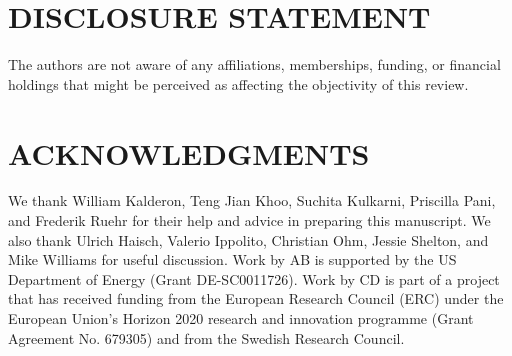 \documentclass{ar-1col}
\begin{document}
\section*{DISCLOSURE STATEMENT}
The authors are not aware of any affiliations, memberships, funding, or financial holdings that
might be perceived as affecting the objectivity of this review. 

\section*{ACKNOWLEDGMENTS}
We thank William Kalderon, Teng Jian Khoo, Suchita Kulkarni, Priscilla Pani, and Frederik Ruehr for their help and advice in preparing this manuscript. 
We also thank Ulrich Haisch, Valerio Ippolito, Christian Ohm, Jessie Shelton, and Mike Williams for useful discussion.
Work by AB is supported by the US Department of Energy (Grant DE-SC0011726).
Work by CD is part of a project that has received funding from the European Research Council (ERC) under the European Union's Horizon 2020 research and innovation programme (Grant Agreement No. 679305) and from the Swedish Research Council. 
%



\end{document}
